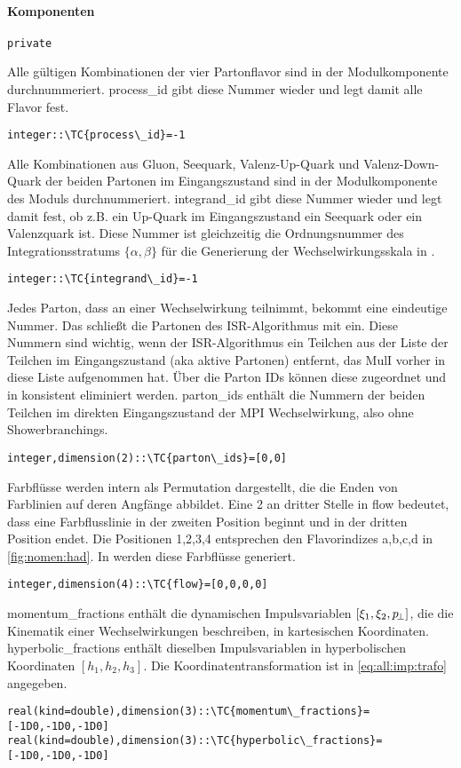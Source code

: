 \paragraph{Komponenten}
\begin{Verbatim}
private
\end{Verbatim}
Alle gültigen Kombinationen der vier Partonflavor sind in der Modulkomponente\linebreak {} durchnummeriert. process\_id gibt diese Nummer wieder und legt damit alle Flavor fest.
\begin{Verbatim}
integer::\TC{process\_id}=-1
\end{Verbatim}
Alle Kombinationen aus Gluon, Seequark, Valenz-Up-Quark und Valenz-Down-Quark der beiden Partonen im Eingangszustand sind in der Modulkomponente  des Moduls  durchnummeriert. integrand\_id gibt diese Nummer wieder und legt damit fest, ob z.B. ein Up-Quark im Eingangszustand ein Seequark oder ein Valenzquark ist. Diese Nummer ist gleichzeitig die Ordnungsnummer des Integrationsstratums $\{\alpha,\beta\}$ für die Generierung der Wechselwirkungsskala in .
\begin{Verbatim}
integer::\TC{integrand\_id}=-1
\end{Verbatim}
Jedes Parton, dass an einer Wechselwirkung teilnimmt, bekommt eine eindeutige Nummer. Das schließt die Partonen des ISR-Algorithmus mit ein. Diese Nummern sind wichtig, wenn der ISR-Algorithmus ein Teilchen aus der Liste der Teilchen im Eingangszustand (aka aktive Partonen) entfernt, das MulI vorher in diese Liste aufgenommen hat. Über die Parton IDs können diese zugeordnet und in  konsistent eliminiert werden. parton\_ids enthält die Nummern der beiden Teilchen im direkten Eingangszustand der MPI Wechselwirkung, also ohne Showerbranchings.
\begin{Verbatim}
integer,dimension(2)::\TC{parton\_ids}=[0,0]
\end{Verbatim}
Farbflüsse werden intern als Permutation dargestellt, die die Enden von Farblinien auf deren Angfänge abbildet. Eine 2 an dritter Stelle in flow bedeutet, dass eine Farbflusslinie in der zweiten Position beginnt und in der dritten Position endet. Die Positionen 1,2,3,4 entsprechen den Flavorindizes a,b,c,d in \ref{fig:nomen:had}. In  werden diese Farbflüsse generiert.
\begin{Verbatim}
integer,dimension(4)::\TC{flow}=[0,0,0,0]
\end{Verbatim}
momentum\_fractions enthält die dynamischen Impulsvariablen $[\xi_1,\xi_2,p_{\!\perp}]$, die die Kinematik einer Wechselwirkungen beschreiben, in kartesischen Koordinaten. hyperbolic\_fractions enthält dieselben Impulsvariablen in hyperbolischen Koordinaten $[h_1,h_2,h_3]$. Die Koordinatentransformation ist in \eqref{eq:all:imp:trafo} angegeben.
\begin{Verbatim}
real(kind=double),dimension(3)::\TC{momentum\_fractions}=[-1D0,-1D0,-1D0]
real(kind=double),dimension(3)::\TC{hyperbolic\_fractions}=[-1D0,-1D0,-1D0]
\end{Verbatim}
